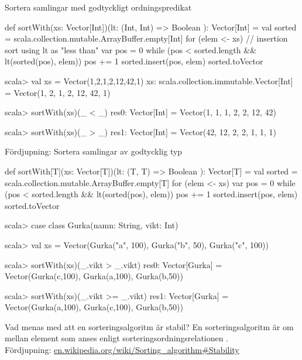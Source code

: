 \begin{Slide}{Sortera samlingar med godtyckligt ordningspredikat}
\begin{Code}
def sortWith(xs: Vector[Int])(lt: (Int, Int) => Boolean ): Vector[Int] = {
  val sorted = scala.collection.mutable.ArrayBuffer.empty[Int] 
  for (elem <- xs) {  // insertion sort using lt as "less than"
     var pos = 0
     while (pos < sorted.length && lt(sorted(pos), elem)) {
       pos += 1
     }     
     sorted.insert(pos, elem) 
  }
  sorted.toVector
}
\end{Code}
\pause
\begin{REPL}
scala> val xs = Vector(1,2,1,2,12,42,1)
xs: scala.collection.immutable.Vector[Int] = Vector(1, 2, 1, 2, 12, 42, 1)

scala> sortWith(xs)(_ < _)
res0: Vector[Int] = Vector(1, 1, 1, 2, 2, 12, 42)

scala> sortWith(xs)(_ > _)
res1: Vector[Int] = Vector(42, 12, 2, 2, 1, 1, 1)
\end{REPL}
\end{Slide}


\begin{Slide}{Fördjupning: Sortera samlingar av godtycklig typ}
\vspace{-0.25em}
\begin{Code}
def sortWith[T](xs: Vector[T])(lt: (T, T) => Boolean ): Vector[T] = {
  val sorted = scala.collection.mutable.ArrayBuffer.empty[T] 
  for (elem <- xs) {  
     var pos = 0
     while (pos < sorted.length && lt(sorted(pos), elem)) {
       pos += 1
     }     
     sorted.insert(pos, elem) 
  }
  sorted.toVector
}
\end{Code}
\pause\vspace{-0.25em}
\begin{REPL}
scala> case class Gurka(namn: String, vikt: Int)

scala> val xs = Vector(Gurka("a", 100), Gurka("b", 50), Gurka("c", 100))

scala> sortWith(xs)(_.vikt > _.vikt)
res0: Vector[Gurka] = Vector(Gurka(c,100), Gurka(a,100), Gurka(b,50))

scala> sortWith(xs)(_.vikt >= _.vikt)
res1: Vector[Gurka] = Vector(Gurka(a,100), Gurka(c,100), Gurka(b,50))
\end{REPL}
\end{Slide}


\begin{Slide}{Vad menas med att en sorteringsalgoritm är stabil?}
En sorteringsalgoritm är  om  mellan element som anses  enligt sorteringsordningsrelationen .\\\vspace{1em}
Fördjupning: 
\href{https://en.wikipedia.org/wiki/Sorting_algorithm#Stability}
{en.wikipedia.org/wiki/Sorting\_algorithm\#Stability}
\end{Slide}

